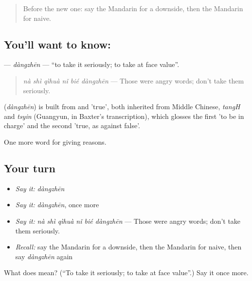 \label{lesson:ZH-C373-dangzhen}



\begin{quote}
Before the new one: say the Mandarin for a downside, then the Mandarin for naive.
\end{quote}

\subsection*{You'll want to know: }
\textbf{} — \emph{dàngzhēn} — \textquotedblleft{}to take it seriously; to take at face value\textquotedblright{}.

\begin{quote}
\emph{nà shì qìhuà nǐ bié dàngzhēn} — Those were angry words; don't take them seriously.
\end{quote}

\begin{cousinweb}
\textbf{} (\emph{dàngzhēn}) is built from  and  'true', both inherited from Middle Chinese, \emph{tangH} and \emph{tsyin} (Guangyun, in Baxter's transcription), which glosses the first 'to be in charge' and the second 'true, as against false'.
\end{cousinweb}

\begin{grammarlens}[title={What you've built}]
One more word for giving reasons.
\end{grammarlens}

\subsection*{Your turn}
\begin{itemize}
\raggedright
  \item \emph{Say it:} \emph{dàngzhēn}
  \item \emph{Say it:} \emph{dàngzhēn}, once more
  \item \emph{Say it:} \emph{nà shì qìhuà nǐ bié dàngzhēn} — Those were angry words; don't take them seriously.
  \item \emph{Recall:} say the Mandarin for a downside, then the Mandarin for naive, then say \emph{dàngzhēn} again
\end{itemize}

\begin{tcolorbox}[breakable,colback=teal!4,colframe=teal!35!black,title={Before you move on}]
What does  mean? (\textquotedblleft{}To take it seriously; to take at face value\textquotedblright{}.) Say it once more.
\end{tcolorbox}
